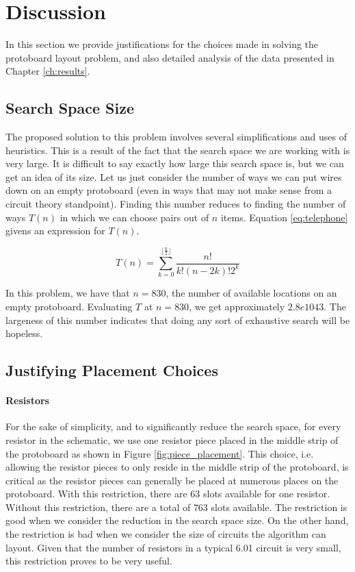 
\chapter{Discussion}
\label{ch:discussion}

In this section we provide justifications for the choices made in solving the
protoboard layout problem, and also detailed analysis of the data presented in
Chapter \ref{ch:results}.

\section{Search Space Size}

The proposed solution to this problem involves several simplifications and uses
of heuristics. This is a result of the fact that the search space we are working
with is very large. It is difficult to say exactly how large this search space
is, but we can get an idea of its size. Let us just consider the number of ways
we can put wires down on an empty protoboard (even in ways that may not make
sense
from a circuit theory standpoint). Finding this number reduces to finding the
number of ways $T(n)$ in which we can choose pairs out of $n$ items. Equation
\ref{eq:telephone} givens an expression for $T(n)$.

\begin{equation}
T(n) = \sum_{k = 0}^{\lfloor \frac{n}{2} \rfloor}{\frac{n!}{k! (n - 2k)! 2^k}}
\label{eq:telephone}
\end{equation}

In this problem, we have that $n = 830$, the number of available locations on an
empty protoboard. Evaluating $T$ at $n = 830$, we get approximately $2.8e1043$.
The largeness of this number indicates that doing any sort of exhaustive search
will be hopeless.

\section{Justifying Placement Choices}
\label{sec:justify_placement}

\subsubsection{Resistors}

For the sake of simplicity, and to significantly reduce the search space, for
every resistor in the schematic, we use one resistor piece placed in the middle
strip of the protoboard as shown in Figure
\ref{fig:piece_placement}. This choice, i.e. allowing the resistor pieces to
only reside in the middle strip of the protoboard, is critical
as the resistor pieces can generally be placed at numerous places on the
protoboard.
With this restriction, there are $63$ slots available for one resistor. Without
this restriction, there are a total of $763$ slots available. The restriction is
good when we consider the reduction in the search space size. On the other hand,
the restriction is bad when we
consider the size of circuits the algorithm can layout. Given that the number
of resistors in a typical 6.01 circuit is very
small, this restriction proves to be very useful.

